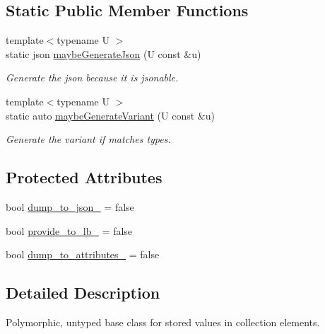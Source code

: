 \subsection*{Static Public Member Functions}
\begin{DoxyCompactItemize}
\item 
{\footnotesize template$<$typename U $>$ }\\static json \hyperlink{structvt_1_1vrt_1_1collection_1_1storage_1_1_store_elm_base_ad10346011cc11fffcfb52bf4b124f207}{maybe\+Generate\+Json} (U const \&u)
\begin{DoxyCompactList}\small\item\em Generate the json because it is jsonable. \end{DoxyCompactList}\item 
{\footnotesize template$<$typename U $>$ }\\static auto \hyperlink{structvt_1_1vrt_1_1collection_1_1storage_1_1_store_elm_base_a2da42349fb45cd9bc61c71073cf5dc76}{maybe\+Generate\+Variant} (U const \&u)
\begin{DoxyCompactList}\small\item\em Generate the variant if matches types. \end{DoxyCompactList}\end{DoxyCompactItemize}
\subsection*{Protected Attributes}
\begin{DoxyCompactItemize}
\item 
bool \hyperlink{structvt_1_1vrt_1_1collection_1_1storage_1_1_store_elm_base_a7bd87e77194a384ecb0a7450d9e7a24a}{dump\+\_\+to\+\_\+json\+\_\+} = false
\item 
bool \hyperlink{structvt_1_1vrt_1_1collection_1_1storage_1_1_store_elm_base_a2818c3e0d6a4c0705170f98c0b51347e}{provide\+\_\+to\+\_\+lb\+\_\+} = false
\item 
bool \hyperlink{structvt_1_1vrt_1_1collection_1_1storage_1_1_store_elm_base_ac60d51135f5498642631bd0d8e515a20}{dump\+\_\+to\+\_\+attributes\+\_\+} = false
\end{DoxyCompactItemize}


\subsection{Detailed Description}
Polymorphic, untyped base class for stored values in collection elements. 

